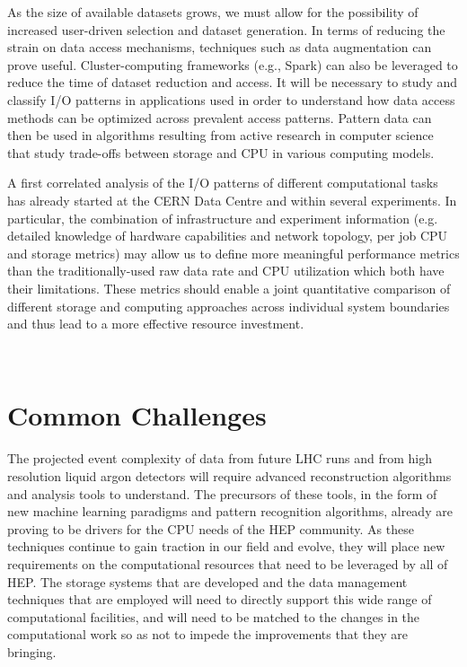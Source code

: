 \documentclass[12pt,a4paper]{article}
\begin{document}
As the size of available datasets grows, we must allow for the
possibility of increased user-driven selection and dataset generation.
In terms of reducing the strain on data access mechanisms, techniques such as data
augmentation can prove useful. Cluster-computing frameworks (e.g.,
Spark) can also be leveraged to reduce the time of dataset reduction and
access. It will be necessary to study and classify I/O patterns in
applications used in order to understand how data access methods can be
optimized across prevalent access patterns. Pattern data can then be
used in algorithms resulting from active research in computer science
that study trade-offs between storage and CPU in various computing models.

A first correlated analysis of the I/O patterns of different
computational tasks has already started at the CERN Data Centre and
within several experiments. In particular, the combination of
infrastructure and experiment information (e.g. detailed knowledge of
hardware capabilities and network topology, per job CPU and storage
metrics) may allow us to define more meaningful performance metrics than
the traditionally-used raw data rate and CPU utilization which both have
their limitations. These metrics should enable a joint quantitative
comparison of different storage and computing approaches across
individual system boundaries and thus lead to a more effective resource
investment.

~

\section{Common Challenges}\label{common-challenges}

The projected event complexity of data from future LHC runs and from
high resolution liquid argon detectors will require advanced
reconstruction algorithms and analysis tools to understand. The
precursors of these tools, in the form of new machine learning paradigms
and pattern recognition algorithms, already are proving to be drivers
for the CPU needs of the HEP community. As these techniques continue to
gain traction in our field and evolve, they will place new requirements on the computational
resources that need to be leveraged by all of HEP. The storage systems
that are developed and the data management techniques that are employed
will need to directly support this wide range of computational
facilities, and will need to be matched to the changes in the
computational work so as not to impede the improvements that they are
bringing.
\end{document}

